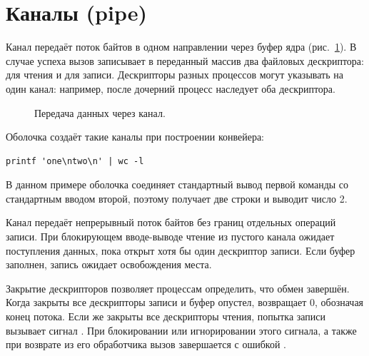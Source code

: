\section{Каналы (pipe)}

Канал передаёт поток байтов в одном направлении через буфер ядра (рис.~\ref*{fig:ipc-pipe}). В случае успеха вызов  записывает в переданный массив два файловых дескриптора:  для чтения и  для записи. Дескрипторы разных процессов могут указывать на один канал: например, после  дочерний процесс наследует оба дескриптора.

\begin{figure}[!htb]
  \centering
  \caption{Передача данных через канал.}
  \label{fig:ipc-pipe}
\end{figure}

\par\addvspace{10pt}\noindent\begin{minipage}{\linewidth}
\setlength{\parindent}{0pt}\noindent\hspace*{1.25cm}Оболочка создаёт такие каналы при построении конвейера:\par\kern 10pt
\begin{verbatim}
printf 'one\ntwo\n' | wc -l
\end{verbatim}
\end{minipage}\par\addvspace{10pt}

В данном примере оболочка соединяет стандартный вывод первой команды со стандартным вводом второй, поэтому  получает две строки и выводит число 2.

Канал передаёт непрерывный поток байтов без границ отдельных операций записи. При блокирующем вводе-выводе чтение из пустого канала ожидает поступления данных, пока открыт хотя бы один дескриптор записи. Если буфер заполнен, запись ожидает освобождения места.

Закрытие дескрипторов позволяет процессам определить, что обмен завершён. Когда закрыты все дескрипторы записи и буфер опустел,  возвращает 0, обозначая конец потока. Если же закрыты все дескрипторы чтения, попытка записи вызывает сигнал . При блокировании или игнорировании этого сигнала, а также при возврате из его обработчика вызов  завершается с ошибкой .

